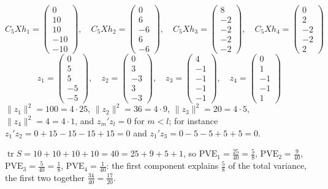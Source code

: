 \documentclass[12pt]{article}
\DeclareMathOperator{\tr}{tr}
\theoremstyle{definition}
\begin{document}
\begin{board}[Scores \(z_m=C_5Xv_m=\frac12C_5Xh_m\) (\(C_5X\) of Example~\ref{h-exm-data}); check (Theorem~\ref{h-thm-pca}(d)):]
\[
C_5Xh_1=\begin{pmatrix}0\\10\\10\\-10\\-10\end{pmatrix},\quad C_5Xh_2=\begin{pmatrix}0\\6\\-6\\6\\-6\end{pmatrix},\quad
C_5Xh_3=\begin{pmatrix}8\\-2\\-2\\-2\\-2\end{pmatrix},\quad C_5Xh_4=\begin{pmatrix}0\\2\\-2\\-2\\2\end{pmatrix}
\]
\[
z_1=\begin{pmatrix}0\\5\\5\\-5\\-5\end{pmatrix},\quad z_2=\begin{pmatrix}0\\3\\-3\\3\\-3\end{pmatrix},\quad
z_3=\begin{pmatrix}4\\-1\\-1\\-1\\-1\end{pmatrix},\quad z_4=\begin{pmatrix}0\\1\\-1\\-1\\1\end{pmatrix}
\]
\(\lVert z_1\rVert^2=100=4\cdot25\), \(\lVert z_2\rVert^2=36=4\cdot9\), \(\lVert z_3\rVert^2=20=4\cdot5\),
\(\lVert z_4\rVert^2=4=4\cdot1\), and \(z_m'z_l=0\) for \(m<l\); for instance \(z_1'z_2=0+15-15-15+15=0\) and
\(z_1'z_3=0-5-5+5+5=0\).
\end{board}
\begin{board}
\(\tr S=10+10+10+10=40=25+9+5+1\), so \(\mathrm{PVE}_1=\frac{25}{40}=\frac58\), \(\mathrm{PVE}_2=\frac9{40}\),
\(\mathrm{PVE}_3=\frac5{40}=\frac18\), \(\mathrm{PVE}_4=\frac1{40}\): the first component explains \(\frac58\) of the
total variance, the first two together \(\frac{34}{40}=\frac{17}{20}\).
\end{board}
\end{document}
